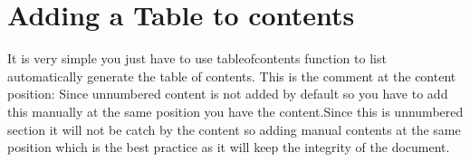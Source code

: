 \documentclass[12pt]{report}
\begin{document}
\section{Adding a Table to contents}
It is very simple you just have to use tableofcontents function to list automatically generate the table of contents. 
This is the comment at the content position: Since unnumbered content is not added by default so you have to add this manually at the same position you have the content.Since this is unnumbered section it will not be catch by the content so adding manual contents at the same position which is the best practice as it will keep the integrity of the document.
\end{document}
